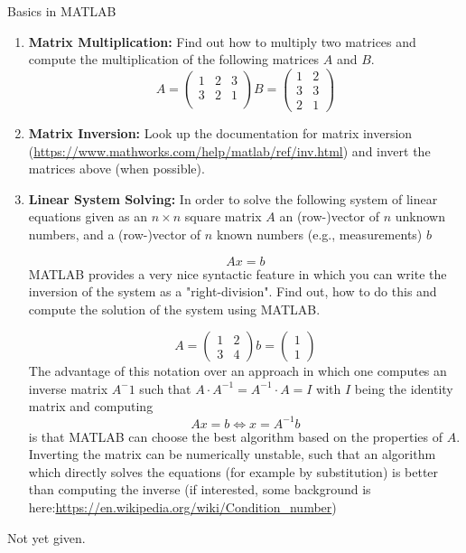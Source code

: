 \begin{task}{Basics in MATLAB}{}{}
\begin{enumerate}
\item{\textbf{Matrix Multiplication:}
Find out how to multiply two matrices and compute the multiplication of the following matrices $A$ and $B$.
\[
  A= \begin{pmatrix}
1 & 2 & 3\\
3 & 2 & 1\\
\end{pmatrix}
B= \begin{pmatrix}
1 & 2 \\
3 & 3 \\
2 & 1
\end{pmatrix}
\]
}
\item{\textbf{Matrix Inversion:} Look up the documentation for matrix inversion (\url{https://www.mathworks.com/help/matlab/ref/inv.html}) and invert the matrices above (when possible).}

\item{\textbf{Linear System Solving:} In order to solve the following system of linear equations given as an $n \times n$ square matrix $A$ an (row-)vector of $n$ unknown numbers, and a (row-)vector of $n$ known numbers (e.g., measurements) $b$

\[
Ax =b
\]
MATLAB provides a very nice syntactic feature in which you can write the inversion of the system as a "right-division". Find out, how to do this and compute the solution of the system using MATLAB.

\[
A =\begin{pmatrix}
1 & 2 \\
3 & 4
\end{pmatrix}
b=\begin{pmatrix}
1 \\
1
\end{pmatrix}
\]
The advantage of this notation over an approach in which one computes an inverse matrix $A^-1$ such that $A\cdot A^{-1} = A^{-1}\cdot A = I$ with $I$ being the identity matrix and computing
\[
  Ax = b \Leftrightarrow x = A^{-1}b
  \]
  is that MATLAB can choose the best algorithm based on the properties of $A$. Inverting the matrix can be numerically unstable, such that an algorithm which directly solves the equations (for example by substitution) is better than computing the inverse (if interested, some background is here:\url{https://en.wikipedia.org/wiki/Condition_number})
  }
\end{enumerate}
\begin{solution}
  Not yet given.
  \end{solution}
\end{task}

